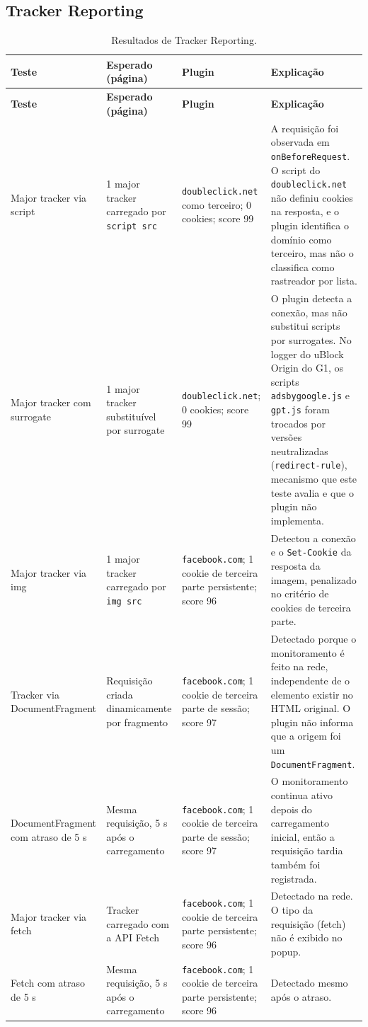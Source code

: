 \documentclass[11pt,a4paper]{article}
\begin{document}
\subsection{Tracker Reporting}

\small
\begin{longtable}{|p{2.6cm}|p{3cm}|p{3.4cm}|p{5.0cm}|}
\caption{Resultados de Tracker Reporting.}\\
\hline
\textbf{Teste} & \textbf{Esperado (página)} & \textbf{Plugin} & \textbf{Explicação} \\ \hline
\endfirsthead
\hline
\textbf{Teste} & \textbf{Esperado (página)} & \textbf{Plugin} & \textbf{Explicação} \\ \hline
\endhead
Major tracker via script & 1 major tracker carregado por \texttt{script src} & \texttt{doubleclick.\allowbreak{}net} como terceiro; 0 cookies; score 99 & A requisição foi observada em \texttt{onBeforeRequest}. O script do \texttt{doubleclick.\allowbreak{}net} não definiu cookies na resposta, e o plugin identifica o domínio como terceiro, mas não o classifica como rastreador por lista. \\ \hline
Major tracker com surrogate & 1 major tracker substituível por surrogate & \texttt{doubleclick.\allowbreak{}net}; 0 cookies; score 99 & O plugin detecta a conexão, mas não substitui scripts por surrogates. No logger do uBlock Origin do G1, os scripts \texttt{adsbygoogle.\allowbreak{}js} e \texttt{gpt.\allowbreak{}js} foram trocados por versões neutralizadas (\texttt{redirect-rule}), mecanismo que este teste avalia e que o plugin não implementa. \\ \hline
Major tracker via img & 1 major tracker carregado por \texttt{img src} & \texttt{facebook.\allowbreak{}com}; 1 cookie de terceira parte persistente; score 96 & Detectou a conexão e o \texttt{Set-Cookie} da resposta da imagem, penalizado no critério de cookies de terceira parte. \\ \hline
Tracker via DocumentFragment & Requisição criada dinamicamente por fragmento & \texttt{facebook.\allowbreak{}com}; 1 cookie de terceira parte de sessão; score 97 & Detectado porque o monitoramento é feito na rede, independente de o elemento existir no HTML original. O plugin não informa que a origem foi um \texttt{DocumentFragment}. \\ \hline
DocumentFragment com atraso de 5 s & Mesma requisição, 5 s após o carregamento & \texttt{facebook.\allowbreak{}com}; 1 cookie de terceira parte de sessão; score 97 & O monitoramento continua ativo depois do carregamento inicial, então a requisição tardia também foi registrada. \\ \hline
Major tracker via fetch & Tracker carregado com a API Fetch & \texttt{facebook.\allowbreak{}com}; 1 cookie de terceira parte persistente; score 96 & Detectado na rede. O tipo da requisição (fetch) não é exibido no popup. \\ \hline
Fetch com atraso de 5 s & Mesma requisição, 5 s após o carregamento & \texttt{facebook.\allowbreak{}com}; 1 cookie de terceira parte persistente; score 96 & Detectado mesmo após o atraso. \\ \hline
\end{longtable}
\normalsize
\end{document}
